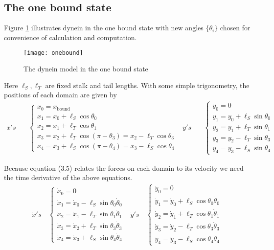 		\subsection{The one bound state}
		Figure \ref{fig:one bound} illustrates dynein in the one bound state with new angles $\{\theta_i\}$ chosen for convenience of calculation and computation.\\
		\begin{figure}[!hbt]
			\centering
			\texttt{[image: onebound]}
			\caption{The dynein model in the one bound state }
			\label{fig:one bound}  
		\end{figure}
		
		\noindent Here $\ell_S, \ell_T$ are fixed stalk and tail lengths. With some simple trigonometry, the positions of each domain are given by
		\begin{align}
		x's \quad &\begin{cases}
		x_0 = x_\text{bound} \\
		x_1 = x_0 + \ell_S \cos\theta_0 \\
		x_2 = x_1 + \ell_T \cos\theta_1 \\
		x_3 = x_2 + \ell_T \cos(\pi-\theta_3) = x_2 - \ell_T\cos\theta_3 \\
		x_4 = x_3 + \ell_S \cos(\pi-\theta_4) = x_3 - \ell_S\cos\theta_4
		\end{cases} &
		y's \quad &\begin{cases}
		y_0 = 0 \\
		y_1 = y_0 + \ell_S\sin\theta_0 \\
		y_2 = y_1 + \ell_T\sin\theta_1 \\
		y_3 = y_2 - \ell_T\sin\theta_3 \\
		y_4 = y_3 - \ell_S\sin\theta_4 
		\end{cases}
		\end{align} 
		
		\noindent Because equation (3.5) relates the forces on each domain to its velocity we need the time derivative of the above equations. 
		\begin{align}
		\dot{x}'s \quad \begin{cases}
		\dot{x}_0 = 0 \\
		\dot{x}_1 = \dot{x}_0-\ell_S\sin\theta_0 \dot{\theta}_0 \\
		\dot{x}_2 = \dot{x}_1-\ell_T\sin\theta_1 \dot{\theta}_1 \\
		\dot{x}_3 = \dot{x}_2+\ell_T\sin\theta_3 \dot{\theta}_3 \\
		\dot{x}_4 = \dot{x}_3+\ell_S\sin\theta_4 \dot{\theta}_4
		\end{cases} &
		\dot{y}'s \quad \begin{cases}
		\dot{y}_0 = 0 \\
		\dot{y}_1 = \dot{y}_0 + \ell_S\cos\theta_0\dot{\theta}_0 \\
		\dot{y}_2 = \dot{y}_1 + \ell_T\cos\theta_1\dot{\theta}_1 \\
		\dot{y}_3 = \dot{y}_2 - \ell_T\cos\theta_3\dot{\theta}_3 \\
		\dot{y}_4 = \dot{y}_3 - \ell_S\cos\theta_4\dot{\theta}_4
		\end{cases} 
		\end{align}
		
